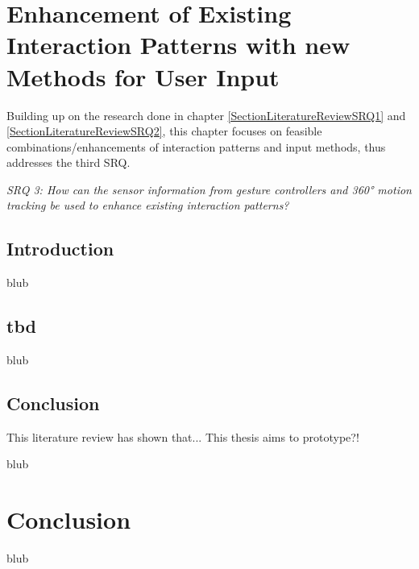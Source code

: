 \section{Enhancement of Existing Interaction Patterns with new Methods for User Input}

\label{SectionLiteratureReviewSRQ3}

Building up on the research done in chapter \ref{SectionLiteratureReviewSRQ1} and \ref{SectionLiteratureReviewSRQ2}, this  chapter focuses on feasible combinations/enhancements of interaction patterns and input methods, thus addresses the third SRQ.
\begin{framed}
	\textit{SRQ 3: How can the sensor information from gesture controllers and 360° motion tracking be used to enhance existing interaction patterns?}
\end{framed}



\subsection{Introduction}

blub



\subsection{tbd}

blub


\subsection{Conclusion}

This literature review has shown that...
\newline
This thesis aims to prototype?!

blub





\section{Conclusion}

\label{SectionLiteratureReviewConclusion}

blub

